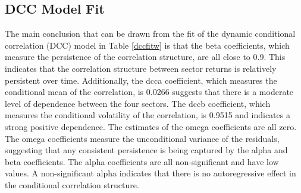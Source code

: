 \documentclass[11pt,preprint, authoryear]{elsarticle}
\numberwithin{equation}{section}
\numberwithin{figure}{section}
\numberwithin{table}{section}
\begin{document}
\hypertarget{dcc-model-fit}{%
\subsection{DCC Model Fit}\label{dcc-model-fit}}

The main conclusion that can be drawn from the fit of the dynamic
conditional correlation (DCC) model in Table \ref{dccfitw} is that the
beta coefficients, which measure the persistence of the correlation
structure, are all close to 0.9. This indicates that the correlation
structure between sector returns is relatively persistent over time.
Additionally, the dcca coefficient, which measures the conditional mean
of the correlation, is 0.0266 suggests that there is a moderate level of
dependence between the four sectors. The dccb coefficient, which
measures the conditional volatility of the correlation, is 0.9515 and
indicates a strong positive dependence. The estimates of the omega
coefficients are all zero. The omega coefficients measure the
unconditional variance of the residuals, suggesting that any consistent
persistence is being captured by the alpha and beta coefficients. The
alpha coefficients are all non-significant and have low values. A
non-significant alpha indicates that there is no autoregressive effect
in the conditional correlation structure.
\end{document}
